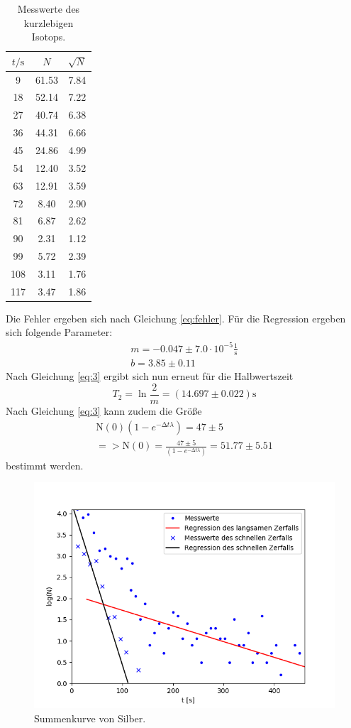 \begin{table} [H]
	\centering
	\caption{Messwerte des kurzlebigen Isotops.}
	\label{tab:3}
	\begin{tabular}{c|c|c}
		\toprule
		{$t / \text{s}$}&{$N$}&{$\sqrt{N}$} \\
		\midrule
		9&61.53&7.84\\
		18&52.14&7.22\\
		27&40.74&6.38\\
		36&44.31&6.66\\
		45&24.86&4.99\\
		54&12.40&3.52\\
		63&12.91&3.59\\
		72&8.40&2.90\\
		81&6.87&2.62\\
		90&2.31&1.12\\
		99&5.72&2.39\\
		108&3.11&1.76\\
		117&3.47&1.86\\
		\bottomrule 
	\end{tabular}
\end{table} 
Die Fehler ergeben sich nach Gleichung \ref{eq:fehler}.
Für die Regression ergeben sich folgende Parameter:
\begin{gather*}
	m = -0.047\pm 7.0\cdot10^{-5} \frac{1}{\text{s}}\\
	b = 3.85\pm0.11
\end{gather*}
Nach Gleichung \ref{eq:3} ergibt sich nun erneut für die Halbwertszeit
\begin{equation}
	T_2 = \ln{\frac{2}{m}} = (14.697 \pm 0.022) \text{s}
\end{equation}
Nach Gleichung \ref{eq:3} kann zudem die Größe
\begin{gather*}
	\text{N}(0)(1-e^{-\increment t\lambda}) = 47 \pm 5 \\
	=> \text{N}(0) = \frac{47 \pm 5}{(1-e^{-\increment t\lambda})} = 51.77 \pm 5.51
\end{gather*}
bestimmt werden.
\begin{figure}[H]
    \centering
    \includegraphics[scale=0.7]{Auswertung/Sum.png}
    \caption{Summenkurve von Silber.}
    \label{fig:sum}
\end{figure}
